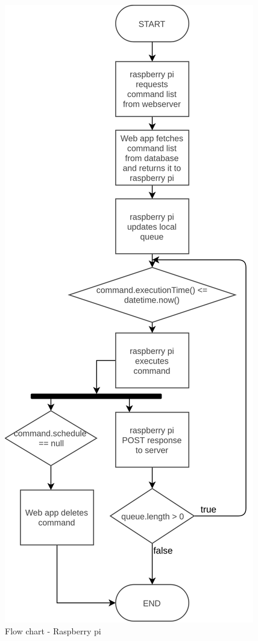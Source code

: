 \documentclass[12pt]{paper}
\begin{document}
		\begin{figure}[H]
			\centering
			\includegraphics[width=.65\linewidth]{img/flowchart_raspberry.png}
			\caption{Flow chart - Raspberry pi}
			\label{fig:ig:flow_rasp}
		\end{figure}
\end{document}
